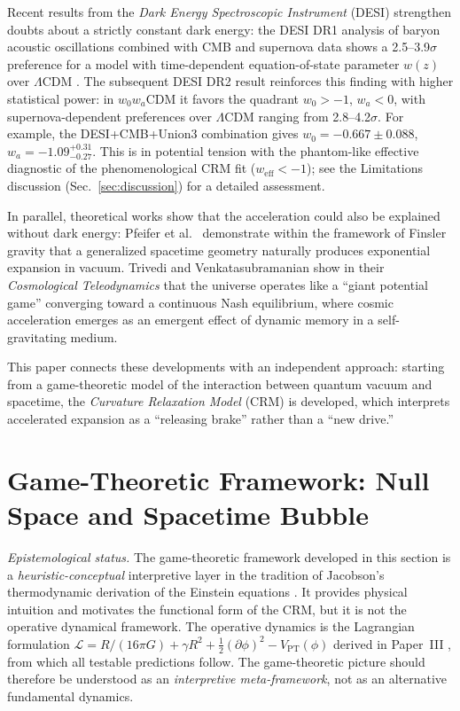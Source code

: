\documentclass[aps,prd,twocolumn,superscriptaddress,nofootinbib]{revtex4-2}
\begin{document}
Recent results from the \textit{Dark Energy Spectroscopic Instrument} (DESI) strengthen doubts about a strictly constant dark energy: the DESI DR1 analysis of baryon acoustic oscillations combined with CMB and supernova data shows a 2.5--3.9$\sigma$ preference for a model with time-dependent equation-of-state parameter $w(z)$ over $\Lambda$CDM \cite{DESI2024}. The subsequent DESI DR2 result \cite{DESI2025} reinforces this finding with higher statistical power: in $w_0w_a$CDM it favors the quadrant $w_0>-1$, $w_a<0$, with supernova-dependent preferences over $\Lambda$CDM ranging from 2.8--4.2$\sigma$. For example, the DESI+CMB+Union3 combination gives $w_0=-0.667\pm0.088$, $w_a=-1.09^{+0.31}_{-0.27}$. This is in potential tension with the phantom-like effective diagnostic of the phenomenological CRM fit ($w_\mathrm{eff} < -1$); see the Limitations discussion (Sec.~\ref{sec:discussion}) for a detailed assessment.

In parallel, theoretical works show that the acceleration could also be explained without dark energy: Pfeifer et al.\ \cite{Pfeifer2025} demonstrate within the framework of Finsler gravity that a generalized spacetime geometry naturally produces exponential expansion in vacuum. Trivedi and Venkatasubramanian \cite{Trivedi2025} show in their \textit{Cosmological Teleodynamics} that the universe operates like a ``giant potential game'' converging toward a continuous Nash equilibrium, where cosmic acceleration emerges as an emergent effect of dynamic memory in a self-gravitating medium.

This paper connects these developments with an independent approach: starting from a game-theoretic model of the interaction between quantum vacuum and spacetime, the \textit{Curvature Relaxation Model} (CRM) is developed, which interprets accelerated expansion as a ``releasing brake'' rather than a ``new drive.''


\section{Game-Theoretic Framework: Null Space and Spacetime Bubble}
\label{sec:gametheory}

\textit{Epistemological status.} The game-theoretic framework developed in this section is a \emph{heuristic-conceptual} interpretive layer in the tradition of Jacobson's thermodynamic derivation of the Einstein equations \cite{Jacobson1995}. It provides physical intuition and motivates the functional form of the CRM, but it is not the operative dynamical framework. The operative dynamics is the Lagrangian formulation $\mathcal{L} = R/(16\pi G) + \gamma R^2 + \frac{1}{2}(\partial\phi)^2 - V_{\mathrm{PT}}(\phi)$ derived in Paper~III \cite{Geiger2026c}, from which all testable predictions follow. The game-theoretic picture should therefore be understood as an \emph{interpretive meta-framework}, not as an alternative fundamental dynamics.
\end{document}
